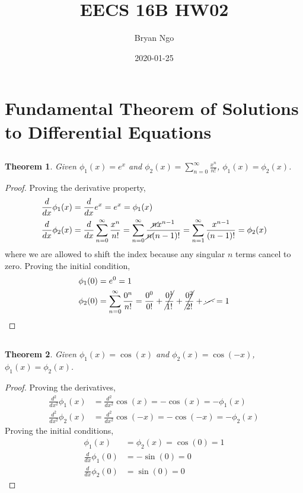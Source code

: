 \documentclass[]{article}
\title{EECS 16B HW02}
\author{Bryan Ngo}
\date{2020-01-25}
\newtheorem{genthm}{Theorem}
\newcommand{\diff}[1]{\frac{d}{d #1}}
\begin{document}
\maketitle

\section{Fundamental Theorem of Solutions to Differential Equations}

\subsection{}

\begin{genthm}
Given \(\phi_1(x) = e^x\) and \(\phi_2(x) = \sum_{n = 0}^{\infty} \frac{x^n}{n!}\), \(\phi_1(x) = \phi_2(x)\).
\end{genthm}

\begin{proof}
Proving the derivative property,
\begin{align}
	\diff{x} \phi_1(x) &= \diff{x} e^x = e^x = \phi_1(x) \\
	\diff{x} \phi_2(x) &= \diff{x} \sum_{n = 0}^{\infty} \frac{x^n}{n!} = \sum_{n = 0}^{\infty} \frac{\cancel{n} x^{n - 1}}{\cancel{n} (n - 1)!} = \sum_{n = 1}^{\infty} \frac{x^{n - 1}}{(n - 1)!} = \phi_2(x)
\end{align}
where we are allowed to shift the index because any singular \(n\) terms cancel to zero.
Proving the initial condition,
\begin{align}
	\phi_1(0) &= e^0 = 1 \\
	\phi_2(0) &= \sum_{n = 0}^{\infty} \frac{0^n}{n!} = \frac{0^0}{0!} + \cancel{\frac{0^1}{1!}} + \cancel{\frac{0^2}{2!}} + \cancel{\cdots} = 1
\end{align}
\end{proof}

\subsection{}

\begin{genthm}
Given \(\phi_1(x) = \cos(x)\) and \(\phi_2(x) = \cos(-x)\), \(\phi_1(x) = \phi_2(x)\).
\end{genthm}

\begin{proof}
Proving the derivatives,
\begin{align}
	\frac{d^2}{dx^2} \phi_1(x) &= \frac{d^2}{dx^2} \cos(x) = -\cos(x) = -\phi_1(x) \\
	\frac{d^2}{dx^2} \phi_2(x) &= \frac{d^2}{dx^2} \cos(-x) =  -\cos(-x) = -\phi_2(x)
\end{align}
Proving the initial conditions,
\begin{align}
	\phi_1(x) &= \phi_2(x) = \cos(0) = 1 \\
	\diff{x} \phi_1(0) &= -\sin(0) = 0 \\
	\diff{x} \phi_2(0) &= \sin(0) = 0
\end{align}
\end{proof}
\end{document}
